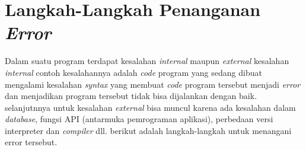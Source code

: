 \chapter{Langkah-Langkah Penanganan \textit{Error}}

\par
Dalam suatu program terdapat kesalahan \textit{internal} maupun \textit{external} kesalahan \textit{internal} contoh kesalahannya adalah \textit{code} program yang sedang dibuat mengalami kesalahan \textit{syntax} yang membuat \textit{code} program tersebut menjadi \textit{error} dan menjadikan program tersebut tidak bisa dijalankan dengan baik. selanjutnnya untuk kesalahan \textit{external} bisa muncul karena ada kesalahan dalam \textit{database}, fungsi API (antarmuka pemrograman aplikasi), perbedaan versi interpreter dan \textit{compiler} dll. berikut adalah langkah-langkah untuk menangani error tersebut.

